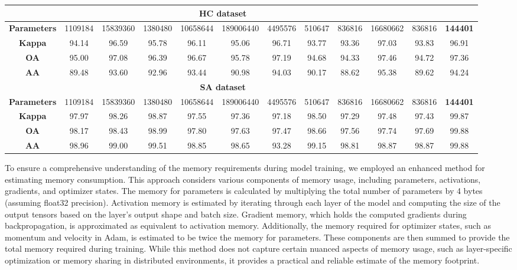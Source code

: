 \documentclass[journal]{IEEEtran}
\begin{document}
\begin{table*}[!hbt]
{\begin{tabular}{c|ccccccc|ccc|c}
        \multicolumn{11}{c}{\textbf{HC dataset}} \\ \hline 
        \textbf{Parameters}  & 1109184 & 15839360 & 1380480 & 10658644 & 189006440 & 4495576 & 510647 & 836816 & 16680662 & 836816 & \textbf{144401} \\ \hline 
        \textbf{Kappa}  & 94.14 & 96.59 & 95.78 & 96.11 & 95.06 & 96.71 & 93.77 & 93.36 & 97.03 & 93.83 & 96.91 \\ \hline 
        \textbf{OA}  & 95.00 & 97.08 & 96.39 & 96.67 & 95.78 & 97.19 & 94.68 & 94.33 & 97.46 & 94.72 & 97.36 \\ \hline 
        \textbf{AA}  & 89.48 & 93.60 & 92.96 & 93.44 & 90.98 & 94.03 & 90.17 & 88.62 & 95.38 & 89.62 & 94.24 \\ \hline \hline
        
        \multicolumn{11}{c}{\textbf{SA dataset}} \\ \hline 
        \textbf{Parameters}  & 1109184 & 15839360 & 1380480 & 10658644 & 189006440 & 4495576 & 510647 & 836816 & 16680662 & 836816 & \textbf{144401} \\ \hline
        \textbf{Kappa} & 97.97 & 98.26 & 98.87 & 97.55 & 97.36 & 97.18 & 98.50 & 97.29 & 97.48 &  97.43 & 99.87 \\ \hline 
        \textbf{OA} & 98.17 & 98.43 & 98.99 & 97.80 & 97.63 & 97.47 & 98.66 & 97.56 & 97.74 & 97.69 & 99.88 \\ \hline 
        \textbf{AA} & 98.96 & 99.00 & 99.51 & 98.85 & 98.65 & 93.28 & 99.15 & 98.81 & 98.87 & 98.87 & 99.88 \\ \hline \hline 
    \end{tabular}}
    \label{comperative}
\end{table*}

To ensure a comprehensive understanding of the memory requirements during model training, we employed an enhanced method for estimating memory consumption. This approach considers various components of memory usage, including parameters, activations, gradients, and optimizer states. The memory for parameters is calculated by multiplying the total number of parameters by 4 bytes (assuming float32 precision). Activation memory is estimated by iterating through each layer of the model and computing the size of the output tensors based on the layer's output shape and batch size. Gradient memory, which holds the computed gradients during backpropagation, is approximated as equivalent to activation memory. Additionally, the memory required for optimizer states, such as momentum and velocity in Adam, is estimated to be twice the memory for parameters. These components are then summed to provide the total memory required during training. While this method does not capture certain nuanced aspects of memory usage, such as layer-specific optimization or memory sharing in distributed environments, it provides a practical and reliable estimate of the memory footprint.
\end{document}
